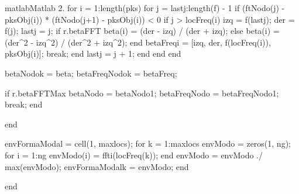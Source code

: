 \begin{sourcecode}{matlab}{Matlab 2.}
    for i = 1:length(pks)
        for j = lastj:length(f) - 1 %
            if (ftNodo(j) - pksObj(i)) * (ftNodo(j+1) - pksObj(i)) < 0 %
                if j > locFreq(i)
                    izq = f(lastj);
                    der = f(j);
                    lastj = j;
                    if r.betaFFT
                        beta(i) = (der - izq) / (der + izq);
                    else
                        beta(i) = (der^2 - izq^2) / (der^2 + izq^2);
                    end
                    betaFreq{i} = [izq, der, f(locFreq(i)), pksObj(i)];
                    break;
                end
                lastj = j + 1; %
            end
        end %
    end %
    
    betaNodo{k} = beta;
    betaFreqNodo{k} = betaFreq;
    
    if r.betaFFTMax
        betaNodo = betaNodo{1};
        betaFreqNodo = betaFreqNodo{1};
        break;
    end
    
end %

envFormaModal = cell(1, maxlocs);
for k = 1:maxlocs
    envModo = zeros(1, ng);
    for i = 1:ng %
        envModo(i) = fft{i}(locFreq(k));
    end %
    envModo = envModo ./ max(envModo);
    envFormaModal{k} = envModo;
end %

end %
\end{sourcecode}

